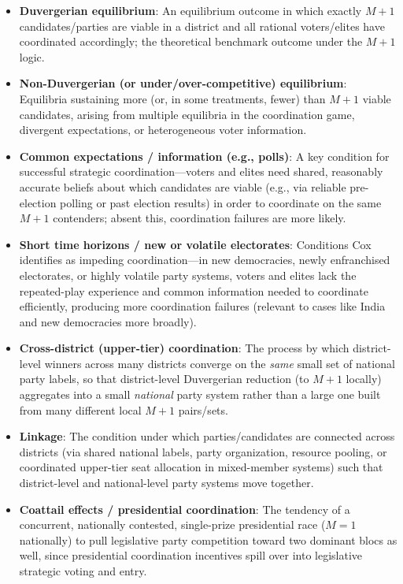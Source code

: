 \documentclass[12pt]{article}
\begin{document}
\begin{itemize}[leftmargin=*, itemsep=4pt]
    \item \textbf{Duvergerian equilibrium}: An equilibrium outcome in which exactly $M+1$ candidates/parties are viable in a district and all rational voters/elites have coordinated accordingly; the theoretical benchmark outcome under the $M+1$ logic.
    \item \textbf{Non-Duvergerian (or under/over-competitive) equilibrium}: Equilibria sustaining more (or, in some treatments, fewer) than $M+1$ viable candidates, arising from multiple equilibria in the coordination game, divergent expectations, or heterogeneous voter information.
    \item \textbf{Common expectations / information (e.g., polls)}: A key condition for successful strategic coordination---voters and elites need shared, reasonably accurate beliefs about which candidates are viable (e.g., via reliable pre-election polling or past election results) in order to coordinate on the same $M+1$ contenders; absent this, coordination failures are more likely.
    \item \textbf{Short time horizons / new or volatile electorates}: Conditions Cox identifies as impeding coordination---in new democracies, newly enfranchised electorates, or highly volatile party systems, voters and elites lack the repeated-play experience and common information needed to coordinate efficiently, producing more coordination failures (relevant to cases like India and new democracies more broadly).
    \item \textbf{Cross-district (upper-tier) coordination}: The process by which district-level winners across many districts converge on the \emph{same} small set of national party labels, so that district-level Duvergerian reduction (to $M+1$ locally) aggregates into a small \emph{national} party system rather than a large one built from many different local $M+1$ pairs/sets.
    \item \textbf{Linkage}: The condition under which parties/candidates are connected across districts (via shared national labels, party organization, resource pooling, or coordinated upper-tier seat allocation in mixed-member systems) such that district-level and national-level party systems move together.
    \item \textbf{Coattail effects / presidential coordination}: The tendency of a concurrent, nationally contested, single-prize presidential race ($M=1$ nationally) to pull legislative party competition toward two dominant blocs as well, since presidential coordination incentives spill over into legislative strategic voting and entry.

\end{itemize}
\end{document}
